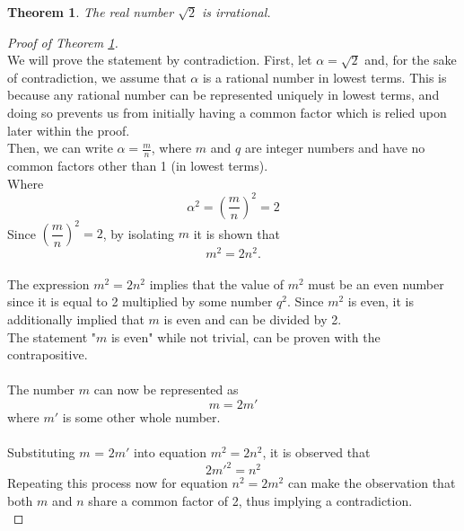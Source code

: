 \documentclass[12pt]{article}
\theoremstyle{plain}
\newtheorem{thm}{Theorem}
\theoremstyle{definition}
\begin{document}
    \begin{thm}\label{thm:main}
        The real number $\sqrt{2}$ is irrational.
    \end{thm}
    
    \begin{proof}
    [{Proof of Theorem \ref{thm:main}}]\hfill\\
    
    We will prove the statement by contradiction. First, let $\alpha=\sqrt{2}$ and, for the sake of contradiction, we assume that $\alpha$ is a rational number in lowest terms. This is because any rational number can be represented uniquely in lowest terms, and doing so prevents us from initially having a common factor which is relied upon later within the proof.\hfill\\
    Then, we can write $\alpha=\frac{m}{n}$, where  $m$ and $q$ are integer numbers and have no common factors other than 1 (in lowest terms).\\

    Where
    $$
        \alpha^2 = \left(\dfrac{m}{n}\right)^2 = 2
    $$
    Since $\left(\dfrac{m}{n}\right)^2 = 2$, by isolating $m$ it is shown that \\
    $$
    m^2 = 2n^2.
    $$\\
    The expression $m^2 = 2n^2$ implies that the value of $m^2$ must be an even number since it is equal to 2 multiplied by some number $q^2$. Since $m^2$ is even, it is additionally implied that $m$ is even and can be divided by 2.\\
    The statement "$m$ is even" while not trivial, can be proven with the contrapositive. \cite{Chili Math}\\\\
    The number $m$ can now be represented as
    $$m = 2m'$$
    where $m'$ is some other whole number.\\ \\
    Substituting $m$ = $2m'$ into equation $m^2 = 2n^2$, it is observed that
    $$2m'^2 = n^2$$
    Repeating this process now for equation $n^2 = 2m^2$ can make the observation that both $m$ and $n$ share a common factor of 2, thus implying a contradiction.\\

    \end{proof}
\end{document}
